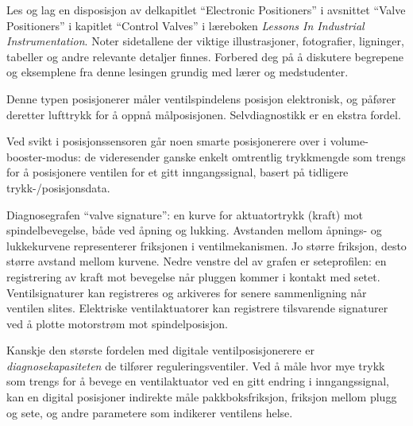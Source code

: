 

Les og lag en disposisjon av delkapitlet ``Electronic Positioners'' i avsnittet ``Valve Positioners'' i kapitlet ``Control Valves'' i læreboken {\it Lessons In Industrial Instrumentation}. Noter sidetallene der viktige illustrasjoner, fotografier, ligninger, tabeller og andre relevante detaljer finnes. Forbered deg på å diskutere begrepene og eksemplene fra denne lesingen grundig med lærer og medstudenter.







 






Denne typen posisjonerer måler ventilspindelens posisjon elektronisk, og påfører deretter lufttrykk for å oppnå målposisjonen. Selvdiagnostikk er en ekstra fordel.

\vskip 10pt

Ved svikt i posisjonssensoren går noen smarte posisjonerere over i volume-booster-modus: de videresender ganske enkelt omtrentlig trykkmengde som trengs for å posisjonere ventilen for et gitt inngangssignal, basert på tidligere trykk-/posisjonsdata.

\vskip 10pt

Diagnosegrafen ``valve signature'': en kurve for aktuatortrykk (kraft) mot spindelbevegelse, både ved åpning og lukking. Avstanden mellom åpnings- og lukkekurvene representerer friksjonen i ventilmekanismen. Jo større friksjon, desto større avstand mellom kurvene. Nedre venstre del av grafen er seteprofilen: en registrering av kraft mot bevegelse når pluggen kommer i kontakt med setet. Ventilsignaturer kan registreres og arkiveres for senere sammenligning når ventilen slites. Elektriske ventilaktuatorer kan registrere tilsvarende signaturer ved å plotte motorstrøm mot spindelposisjon.


\vskip 10pt

Kanskje den største fordelen med digitale ventilposisjonerere er {\it diagnosekapasiteten} de tilfører reguleringsventiler. Ved å måle hvor mye trykk som trengs for å bevege en ventilaktuator ved en gitt endring i inngangssignal, kan en digital posisjoner indirekte måle pakkboksfriksjon, friksjon mellom plugg og sete, og andre parametere som indikerer ventilens helse.






